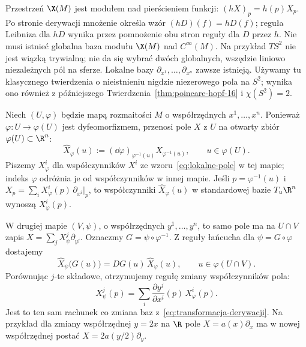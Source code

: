 \begin{uwaga}
Przestrzeń $\X(M)$ jest modułem nad pierścieniem funkcji:
$(hX)_p=h(p)X_p$. Po stronie derywacji mnożenie określa wzór
$(hD)(f)=hD(f)$; reguła Leibniza dla $hD$ wynika przez pomnożenie
obu stron reguły dla $D$ przez $h$.
Nie musi istnieć globalna baza modułu $\X(M)$ nad $C^\infty(M)$.
Na przykład $TS^2$ nie jest wiązką trywialną; nie da się wybrać
dwóch globalnych, wszędzie liniowo niezależnych pól na sferze.
Lokalne bazy $\partial_{x^1},\ldots,\partial_{x^n}$ zawsze istnieją.
Używamy tu klasycznego twierdzenia o nieistnieniu nigdzie
niezerowego pola na $S^2$; wynika ono również z późniejszego
Twierdzenia~\ref{thm:poincare-hopf-16} i $\chi(S^2)=2$.
\end{uwaga}

\begin{uwaga}
Niech $(U,\varphi)$ będzie mapą rozmaitości $M$
o współrzędnych $x^1,\ldots,x^n$.
Ponieważ $\varphi\colon U\to\varphi(U)$ jest dyfeomorfizmem,
przenosi pole $X$ z $U$ na otwarty zbiór $\varphi(U)\subset\R^n$:
\begin{equation}\label{eq:pole-przeniesione-mapa}
\widehat X_\varphi(u)
:=(\dd\varphi)_{\varphi^{-1}(u)}X_{\varphi^{-1}(u)},
\qquad u\in\varphi(U).
\end{equation}
Piszemy $X_\varphi^i$ dla współczynników $X^i$
ze wzoru~\eqref{eq:lokalne-pole} w tej mapie;
indeks $\varphi$ odróżnia je od współczynników w innej mapie.
Jeśli $p=\varphi^{-1}(u)$ i
$X_p=\sum_iX_\varphi^i(p)\,\partial_{x^i}|_p$,
to współczynniki $\widehat X_\varphi(u)$ w standardowej bazie
$T_u\R^n$ wynoszą $X_\varphi^i(p)$.

W drugiej mapie $(V,\psi)$, o współrzędnych $y^1,\ldots,y^n$,
to samo pole ma na $U\cap V$ zapis
$X=\sum_jX_\psi^j\partial_{y^j}$.
Oznaczmy $G=\psi\circ\varphi^{-1}$.
Z reguły łańcucha dla $\psi=G\circ\varphi$ dostajemy
\[
\widehat X_\psi\bigl(G(u)\bigr)
=DG(u)\,\widehat X_\varphi(u),
\qquad u\in\varphi(U\cap V).
\]
Porównując $j$-te składowe, otrzymujemy regułę zmiany
współczynników pola:
\begin{equation}\label{eq:transformacja-wspolczynnikow-pola}
X_\psi^j(p)=\sum_i\frac{\partial y^j}{\partial x^i}(p)\,X_\varphi^i(p).
\end{equation}
Jest to ten sam rachunek co zmiana baz
z~\eqref{eq:transformacja-derywacji}.
Na przykład dla zmiany współrzędnej $y=2x$ na $\R$ pole
$X=a(x)\partial_x$ ma w nowej współrzędnej postać
$X=2a(y/2)\partial_y$.
\end{uwaga}

